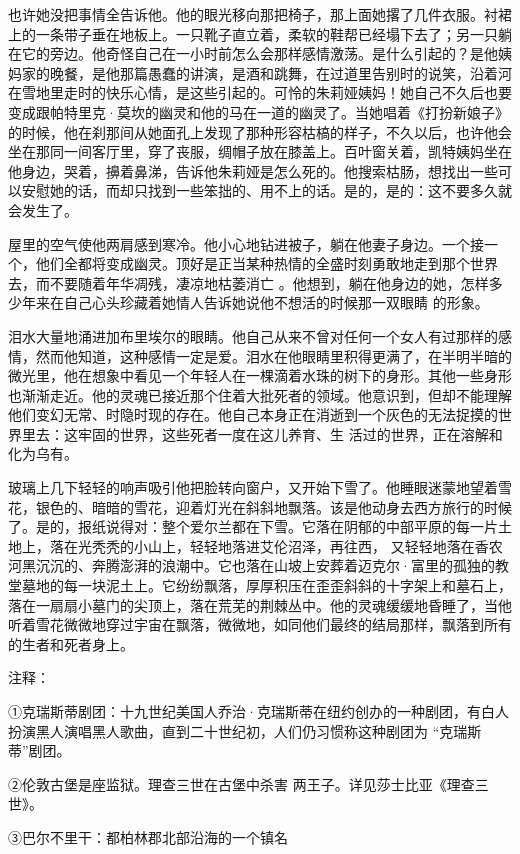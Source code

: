 \documentclass{article}
\begin{document}
也许她没把事情全告诉他。他的眼光移向那把椅子，那上面她撂了几件衣服。衬裙上的一条带子垂在地板上。一只靴子直立着，柔软的鞋帮已经塌下去了；另一只躺在它的旁边。他奇怪自己在一小时前怎么会那样感情激荡。是什么引起的？是他姨妈家的晚餐，是他那篇愚蠢的讲演，是酒和跳舞，在过道里告别时的说笑，沿着河在雪地里走时的快乐心情，是这些引起的。可怜的朱莉娅姨妈！她自己不久后也要变成跟帕特里克·莫坎的幽灵和他的马在一道的幽灵了。当她唱着《打扮新娘子》的时候，他在刹那间从她面孔上发现了那种形容枯槁的样子，不久以后，也许他会坐在那同一间客厅里，穿了丧服，绸帽子放在膝盖上。百叶窗关着，凯特姨妈坐在他身边，哭着，擤着鼻涕，告诉他朱莉娅是怎么死的。他搜索枯肠，想找出一些可以安慰她的话，而却只找到一些笨拙的、用不上的话。是的，是的：这不要多久就会发生了。

屋里的空气使他两肩感到寒冷。他小心地钻进被子，躺在他妻子身边。一个接一个，他们全都将变成幽灵。顶好是正当某种热情的全盛时刻勇敢地走到那个世界去，而不要随着年华凋残，凄凉地枯萎消亡
\newpage
。他想到，躺在他身边的她，怎样多少年来在自己心头珍藏着她情人告诉她说他不想活的时候那一双眼睛
的形象。 

泪水大量地涌进加布里埃尔的眼睛。他自己从来不曾对任何一个女人有过那样的感情，然而他知道，这种感情一定是爱。泪水在他眼睛里积得更满了，在半明半暗的微光里，他在想象中看见一个年轻人在一棵滴着水珠的树下的身形。其他一些身形也渐渐走近。他的灵魂已接近那个住着大批死者的领域。他意识到，但却不能理解他们变幻无常、时隐时现的存在。他自己本身正在消逝到一个灰色的无法捉摸的世界里去：这牢固的世界，这些死者一度在这儿养育、生
活过的世界，正在溶解和化为乌有。 

玻璃上几下轻轻的响声吸引他把脸转向窗户，又开始下雪了。他睡眼迷蒙地望着雪花，银色的、暗暗的雪花，迎着灯光在斜斜地飘落。该是他动身去西方旅行的时候了。是的，报纸说得对：整个爱尔兰都在下雪。它落在阴郁的中部平原的每一片土地上，落在光秃秃的小山上，轻轻地落进艾伦沼泽，再往西，
\newpage
又轻轻地落在香农河黑沉沉的、奔腾澎湃的浪潮中。它也落在山坡上安葬着迈克尔·富里的孤独的教堂墓地的每一块泥土上。它纷纷飘落，厚厚积压在歪歪斜斜的十字架上和墓石上，落在一扇扇小墓门的尖顶上，落在荒芜的荆棘丛中。他的灵魂缓缓地昏睡了，当他听着雪花微微地穿过宇宙在飘落，微微地，如同他们最终的结局那样，飘落到所有的生者和死者身上。


注释： 

①克瑞斯蒂剧团：十九世纪美国人乔治·克瑞斯蒂在纽约创办的一种剧团，有白人扮演黑人演唱黑人歌曲，直到二十世纪初，人们仍习惯称这种剧团为
“克瑞斯蒂”剧团。 

②伦敦古堡是座监狱。理查三世在古堡中杀害
两王子。详见莎士比亚《理查三世》。 

③巴尔不里干：都柏林郡北部沿海的一个镇名
\end{document}
